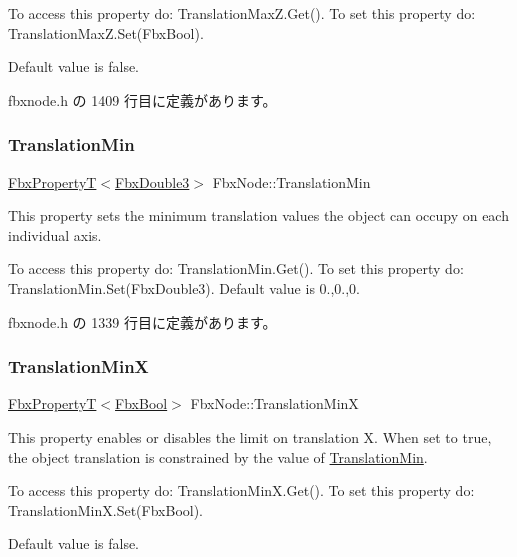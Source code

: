 To access this property do\+: Translation\+Max\+Z.\+Get(). To set this property do\+: Translation\+Max\+Z.\+Set(\+Fbx\+Bool).

Default value is false. 

 fbxnode.\+h の 1409 行目に定義があります。

\mbox{\label{class_fbx_node_aaaa913d4332c2136f50ae15356521413}} 
\subsubsection{\texorpdfstring{Translation\+Min}{TranslationMin}}
{\footnotesize\ttfamily \hyperlink{class_fbx_property_t}{Fbx\+PropertyT}$<$\hyperlink{fbxtypes_8h_ae0a96f14cde566774c7553aa7523b7a7}{Fbx\+Double3}$>$ Fbx\+Node\+::\+Translation\+Min}

This property sets the minimum translation values the object can occupy on each individual axis.

To access this property do\+: Translation\+Min.\+Get(). To set this property do\+: Translation\+Min.\+Set(\+Fbx\+Double3). Default value is 0.,0.,0. 

 fbxnode.\+h の 1339 行目に定義があります。

\mbox{\label{class_fbx_node_a8ffb0049319dbb88db7c0536b4c97339}} 
\subsubsection{\texorpdfstring{Translation\+MinX}{TranslationMinX}}
{\footnotesize\ttfamily \hyperlink{class_fbx_property_t}{Fbx\+PropertyT}$<$\hyperlink{fbxtypes_8h_a92e0562b2fe33e76a242f498b362262e}{Fbx\+Bool}$>$ Fbx\+Node\+::\+Translation\+MinX}

This property enables or disables the limit on translation X. When set to {\ttfamily true}, the object translation is constrained by the value of \hyperlink{class_fbx_node_aaaa913d4332c2136f50ae15356521413}{Translation\+Min}.

To access this property do\+: Translation\+Min\+X.\+Get(). To set this property do\+: Translation\+Min\+X.\+Set(\+Fbx\+Bool).

Default value is false. 

